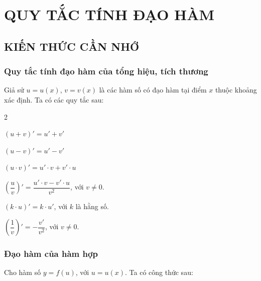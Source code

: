 \section{QUY TẮC TÍNH ĐẠO HÀM}
\subsection{KIẾN THỨC CẦN NHỚ}

\subsubsection{Quy tắc tính đạo hàm của tổng hiệu, tích thương}
Giả sử $u=u(x)$, $v=v(x)$ là các hàm số có đạo hàm tại điểm $x$ thuộc khoảng xác định. Ta có các quy tắc sau:
\begin{tcolorbox}[colframe=cyan,colback=red!1!white,boxrule=0.3mm]
	\begin{itemize}
	\end{itemize}
\end{tcolorbox}

\subsubsection{Đạo hàm của hàm hợp}
Cho hàm số $y=f(u)$, với $u=u(x)$. Ta có công thức sau:
